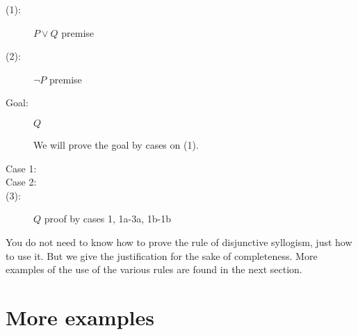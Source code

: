 \documentclass[12pt]{article}
\begin{document}
\begin{description}

\item[(1):]  $P \vee Q$  premise

\item[(2):]  $\neg P$ premise

\item[Goal:]  $Q$

We will prove the goal by cases on (1).

\item[Case 1:]  


\item[Case 2:]


\item[(3):] $Q$ proof by cases 1, 1a-3a, 1b-1b


\end{description}

You do not need to know how to prove the rule of disjunctive syllogism, just how to use it.  But we give the justification for the sake of completeness.  More examples of the use of the various rules are found in the next section.

\section{More examples}
\end{document}
